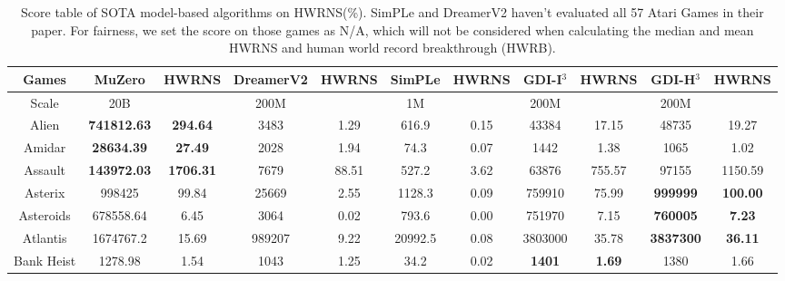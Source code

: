 \documentclass[nohyperref]{article}
\newcommand{\best}[1]{\textbf{#1}}
\theoremstyle{plain}
\begin{document}
\begin{table}[!hb]
\footnotesize
\begin{center}
\caption{Score table of SOTA model-based algorithms on HWRNS(\%). SimPLe \citep{modelbasedatari} and DreamerV2\citep{dreamerv2} haven't evaluated all 57 Atari Games in their paper. For fairness, we set the score on those games as N/A, which will not be considered when calculating the median and mean HWRNS and human world record breakthrough (HWRB). }
\label{Tab:Score table of SOTA model-based algorithms on HWRNS.}
\setlength{\tabcolsep}{1.0pt}
\begin{tabular}{| c |c c| c c| c c| c c| c c| }
\hline
 Games              & MuZero         & HWRNS      & DreamerV2 & HWRNS   & SimPLe             & HWRNS          & GDI-I$^3$     & HWRNS & GDI-H$^3$ & HWRNS \\
\hline
Scale               & 20B            &              & 200M      &            & 1M               &                  & 200M     & &    200M   &\\
\hline
 Alien              & \textbf{741812.63}      & \textbf{294.64  }     &3483       & 1.29     &616.9     & 0.15    & 43384       &  17.15            &48735             &19.27       \\
 Amidar             & \textbf{28634.39 }      & \textbf{27.49   }  &2028       & 1.94     &74.3      & 0.07    & 1442        &  1.38                &1065              &1.02     \\
 Assault            & \textbf{143972.03}      & \textbf{1706.31 }     &7679       & 88.51       &527.2     & 3.62       & 63876       &  755.57     &97155             &1150.59    \\
 Asterix            & 998425         & 99.84        &25669      & 2.55     &1128.3    & 0.09       & 759910      &  75.99         &\textbf{999999}            &\textbf{100.00} \\
 Asteroids          & 678558.64               & 6.45        &3064                & 0.02    &793.6              & 0.00    &751970         & 7.15   &\textbf{760005}            &\textbf{7.23}  \\
 Atlantis           & 1674767.2               & 15.69           &989207              & 9.22       &20992.5            & 0.08       &3803000        & 35.78  &\textbf{3837300}           &\textbf{36.11}  \\
 Bank Heist         & 1278.98                 & 1.54        &1043                & 1.25    &34.2               & 0.02    &\best{1401}           & \best{1.69  }  &1380              &1.66 \\

\end{tabular}
\end{center}
\end{table}
\end{document}
